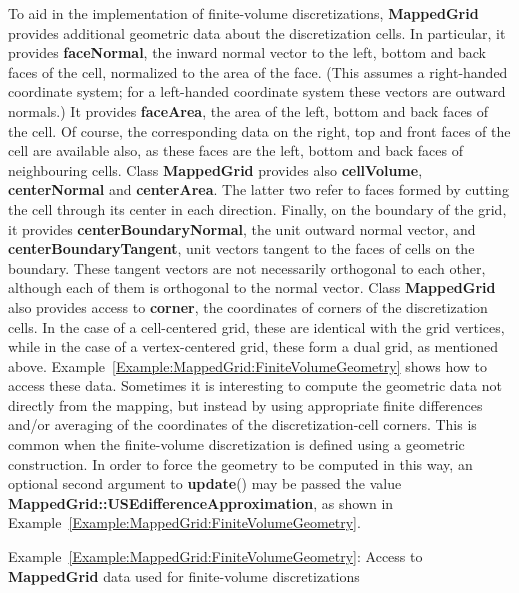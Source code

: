 \documentclass{article}
\begin{document}
To aid in the implementation of finite-volume discretizations,
\textbf{MappedGrid} provides additional geometric data about the discretization cells.  In particular, it provides
\textbf{faceNormal}, the inward normal vector to the left, bottom and back faces of the cell, normalized to the area of the face.
(This assumes a right-handed coordinate system; for a left-handed coordinate system these vectors are outward normals.)
It provides \textbf{faceArea}, the area of the left, bottom and back faces of the cell.  Of course, the corresponding data on
the right, top and front faces of the cell are available also, as these faces are the left, bottom and back faces of neighbouring cells.
Class \textbf{MappedGrid} provides also \textbf{cellVolume}, \textbf{centerNormal} and \textbf{centerArea}.
The latter two refer to faces formed by cutting the cell through its center in each direction.  Finally, on the boundary of the grid, it
provides \textbf{centerBoundaryNormal}, the unit outward normal vector, and \textbf{centerBoundaryTangent}, unit vectors
tangent to the faces of cells on the boundary.  These tangent vectors are not necessarily orthogonal to each other, although each of them is
orthogonal to the normal vector.  Class \textbf{MappedGrid} also provides access to \textbf{corner}, the coordinates of
corners of the discretization cells.  In the case of a cell-centered grid, these are identical with the grid vertices,
while in the case of a vertex-centered grid, these form a dual grid, as mentioned above.
Example~\ref{Example:MappedGrid:FiniteVolumeGeometry} shows how to access these data.  Sometimes it is interesting to compute
the geometric data not directly from the mapping, but instead by using appropriate finite differences and/or averaging of the coordinates of
the discretization-cell corners.  This is common when the finite-volume discretization is defined using a geometric construction.  In order
to force the geometry to be computed in this way, an optional second argument to \textbf{update}() may be passed the value
\textbf{MappedGrid::USEdifferenceApproximation}, as shown in Example~\ref{Example:MappedGrid:FiniteVolumeGeometry}.

{\small
{}
}
{\center Example~\ref{Example:MappedGrid:FiniteVolumeGeometry}: Access to \textbf{MappedGrid} data used for finite-volume 
discretizations\label{Example:MappedGrid:FiniteVolumeGeometry}}
\end{document}

